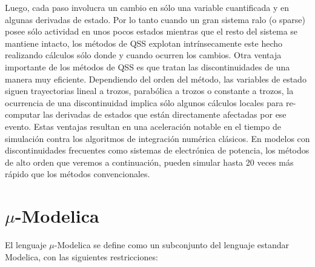 	Luego, cada paso involucra un cambio en sólo una variable cuantificada y en algunas derivadas de estado. 
	Por lo tanto cuando un gran sistema ralo (o sparse) posee sólo actividad en unos pocos estados mientras que el resto del sistema se mantiene 
	intacto, los métodos de QSS explotan intrínsecamente este hecho realizando cálculos sólo donde y cuando ocurren los cambios.
	Otra ventaja importante de los métodos de QSS es que tratan las discontinuidades de una manera muy eficiente. Dependiendo del orden del método, 
	las variables de estado siguen trayectorias lineal a trozos, parabólica a trozos o constante a trozos, la ocurrencia de una discontinuidad implica 
	sólo algunos cálculos locales para re-computar las derivadas de estados que están directamente afectadas por ese evento.
	Estas ventajas resultan en una aceleración notable en el tiempo de simulación contra los algoritmos de integración numérica clásicos. 
	En modelos con discontinuidades frecuentes como sistemas de electrónica de potencia, los métodos de alto orden que veremos a continuación, 
	pueden simular hasta 20 veces más rápido que los métodos convencionales.


\section{$\mu$-Modelica}

	El lenguaje $\mu$-Modelica\cite{Ber12} se define como un subconjunto del lenguaje estandar Modelica, con las siguientes restricciones:


